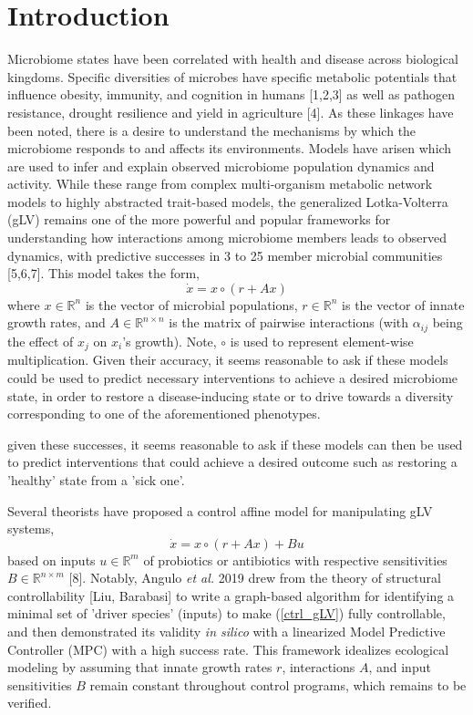 \documentclass[twocolumn, 10pt]{report}
\begin{document}
{\section*{Introduction}
\indent \indent Microbiome states have been correlated with health and disease across biological kingdoms. Specific diversities of microbes have specific metabolic potentials that influence obesity, immunity, and cognition in humans [1,2,3] as well as pathogen resistance, drought resilience and yield in agriculture [4]. As these linkages have been noted, there is a desire to understand the mechanisms by which the microbiome responds to and affects its environments. Models have arisen which are used to infer and explain observed microbiome population dynamics and activity. While these range from complex multi-organism metabolic network models to highly abstracted trait-based models, the generalized Lotka-Volterra (gLV) remains one of the more powerful and popular frameworks for understanding how interactions among microbiome members leads to observed dynamics, with predictive successes in 3 to 25 member microbial communities [5,6,7]. This model takes the form, 
\begin{equation} \label{aut_gLV}
    \dot{x} = x \circ (r + Ax)
\end{equation}
where $x \in \mathbb{R}^n$ is the vector of microbial populations, $r \in \mathbb{R}^n$ is the vector of innate growth rates, and $A \in \mathbb{R}^{n \times n}$ is the matrix of pairwise interactions (with $\alpha_{ij}$ being the effect of $x_j$ on $x_i$'s growth). Note, $\circ$ is used to represent element-wise multiplication. Given their accuracy, it seems reasonable to ask if these models could be used to predict necessary interventions to achieve a desired microbiome state, in order to restore a disease-inducing state or to drive towards a diversity corresponding to one of the aforementioned phenotypes.

given these successes, it seems reasonable to ask if these models can then be used to predict interventions that could achieve a desired outcome such as restoring a 'healthy' state from a 'sick one'. 

Several theorists have proposed a control affine model for manipulating gLV systems,
\begin{equation} \label{ctrl_gLV}
    \dot{x} = x \circ (r + Ax) + Bu
\end{equation}
based on inputs $u \in \mathbb{R}^m$ of probiotics or antibiotics with respective sensitivities $B \in \mathbb{R}^{n \times m}$ [8]. Notably, Angulo \emph{et al.} 2019 drew from the theory of structural controllability [Liu, Barabasi] to write a graph-based algorithm for identifying a minimal set of 'driver species' (inputs) to make (\ref*{ctrl_gLV}) fully controllable, and then demonstrated its validity \textit{in silico} with a linearized Model Predictive Controller (MPC) with a high success rate. This framework idealizes ecological modeling by assuming that innate growth rates $r$, interactions $A$, and input sensitivities $B$ remain constant throughout control programs, which remains to be verified. 

}
\end{document}
